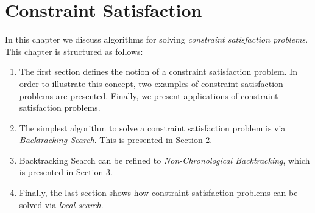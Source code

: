 \chapter{Constraint Satisfaction}
In this chapter we discuss algorithms for solving \emph{\color{blue}constraint satisfaction problems}.
This chapter is structured as follows:
\begin{enumerate}
\item The first section defines the notion of a constraint satisfaction problem.  In order to illustrate this
      concept, two examples of constraint satisfaction problems are presented.  Finally, we present
      applications of constraint satisfaction problems.
\item The simplest algorithm to solve a constraint satisfaction problem is via \emph{\color{blue}Backtracking Search}.
      This is presented in Section 2.
\item Backtracking Search can be refined to \emph{\color{blue}Non-Chronological Backtracking}, which is presented in
      Section 3.
\item Finally, the last section shows how constraint satisfaction problems can be solved via
      \emph{\color{blue}local search}.
\end{enumerate}

